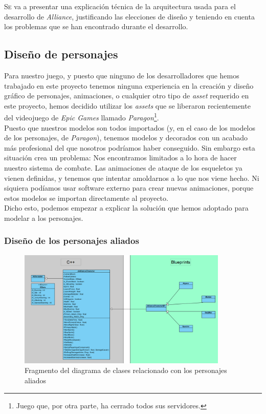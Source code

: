 \lettrine[lines=2,findent=2pt,nindent=3pt,loversize=0.1]{\textcolor[gray]{0.4}{S}}{e} va a presentar una explicación técnica de la arquitectura usada para el desarrollo de \textit{Alliance}, justificando las elecciones de diseño y teniendo en cuenta los problemas que se han encontrado durante el desarrollo.

\subsection{Diseño de personajes}
Para nuestro juego, y puesto que ninguno de los desarrolladores que hemos trabajado en este proyecto tenemos ninguna experiencia en la creación y diseño gráfico de personajes, animaciones, o cualquier otro tipo de \textit{asset} requerido en este proyecto, hemos decidido utilizar los \textit{assets} que se liberaron recientemente del videojuego de \textit{Epic Games} llamado \textit{Paragon}\footnote{Juego que, por otra parte, ha cerrado todos sus servidores.}.
\\

Puesto que nuestros modelos son todos importados (y, en el caso de los modelos de los personajes, de \textit{Paragon}), tenemos modelos y decorados con un acabado más profesional del que nosotros podríamos haber conseguido. Sin embargo esta situación crea un problema: Nos encontramos limitados a lo hora de hacer nuestro sistema de combate. Las animaciones de ataque de los esqueletos ya vienen definidas, y tenemos que intentar amoldarnos a lo que nos viene hecho. Ni siquiera podíamos usar software externo para crear nuevas animaciones, porque estos modelos se importan directamente al proyecto.
\\

Dicho esto, podemos empezar a explicar la solución que hemos adoptado para modelar a los personajes.

\subsubsection{Diseño de los personajes aliados}

\begin{figure}[H]
  \centering
  \includegraphics[width=10cm]{./images/Classes_Aliados.png}
  \caption{Fragmento del diagrama de clases relacionado con los personajes aliados}
  \label{ClassesAllies}
\end{figure}

